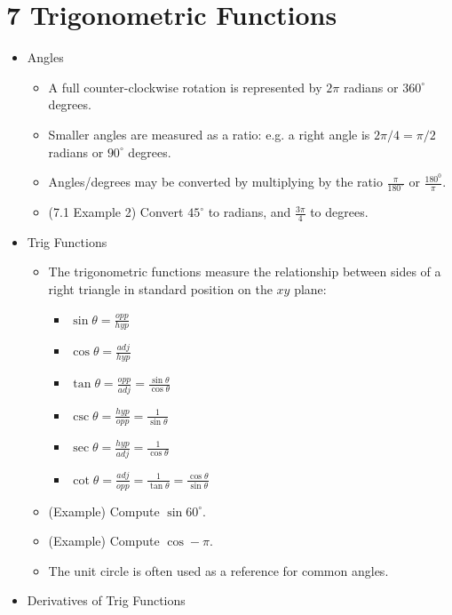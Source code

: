 \documentclass[11pt]{article}
\begin{document}
\section*{7 Trigonometric Functions}

\begin{itemize}
\item Angles
  \begin{itemize}
    \item A full counter-clockwise rotation is represented
          by \(2\pi\) radians or \(360^\circ\) degrees.
    \item Smaller angles are measured as a ratio: e.g. a right angle is
          \(2\pi/4=\pi/2\) radians or \(90^\circ\) degrees.
    \item Angles/degrees may be converted by multiplying by the ratio
          \(\frac{\pi}{180^\circ}\) or \(\frac{180^0}{\pi}\).
    \item (7.1 Example 2) Convert \(45^\circ\) to radians, and
          \(\frac{3\pi}{4}\) to degrees.
  \end{itemize}
\item Trig Functions
  \begin{itemize}
    \item The trigonometric functions measure the relationship between sides
          of a right triangle in standard position on the \(xy\) plane:
      \begin{itemize}
        \item \(\sin\theta = \frac{opp}{hyp}\)
        \item \(\cos\theta = \frac{adj}{hyp}\)
        \item \(\tan\theta = \frac{opp}{adj}=\frac{\sin\theta}{\cos\theta}\)
        \item \(\csc\theta = \frac{hyp}{opp}=\frac{1}{\sin\theta}\)
        \item \(\sec\theta = \frac{hyp}{adj}=\frac{1}{\cos\theta}\)
        \item \(\cot\theta =
          \frac{adj}{opp}=\frac{1}{\tan\theta}=\frac{\cos\theta}{\sin\theta}\)
      \end{itemize}
    \item (Example) Compute \(\sin 60^\circ\).
    \item (Example) Compute \(\cos -\pi\).
    \item The unit circle is often used as a reference for common angles.
  \end{itemize}
\item Derivatives of Trig Functions

\end{itemize}
\end{document}
